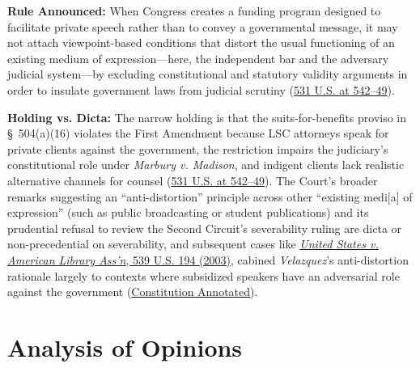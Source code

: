 \documentclass[12pt]{article}
\begin{document}
\textbf{Rule Announced:} When Congress creates a funding program designed to facilitate private speech rather than to convey a governmental message, it may not attach viewpoint-based conditions that distort the usual functioning of an existing medium of expression---here, the independent bar and the adversary judicial system---by excluding constitutional and statutory validity arguments in order to insulate government laws from judicial scrutiny (\href{https://supreme.justia.com/cases/federal/us/531/533/}{531 U.S. at 542--49}).

\textbf{Holding vs. Dicta:} The narrow holding is that the suits-for-benefits proviso in \S~504(a)(16) violates the First Amendment because LSC attorneys speak for private clients against the government, the restriction impairs the judiciary's constitutional role under \textit{Marbury v. Madison}, and indigent clients lack realistic alternative channels for counsel (\href{https://supreme.justia.com/cases/federal/us/531/533/}{531 U.S. at 542--49}). The Court's broader remarks suggesting an ``anti-distortion'' principle across other ``existing medi[a] of expression'' (such as public broadcasting or student publications) and its prudential refusal to review the Second Circuit's severability ruling are dicta or non-precedential on severability, and subsequent cases like \href{https://supreme.justia.com/cases/federal/us/539/194/}{\textit{United States v. American Library Ass'n}, 539 U.S. 194 (2003)}, cabined \textit{Velazquez}'s anti-distortion rationale largely to contexts where subsidized speakers have an adversarial role against the government (\href{https://constitution.congress.gov/browse/essay/amdt1-7-15-8/ALDE_00001280/}{Constitution Annotated}).

\section{Analysis of Opinions}
\end{document}
